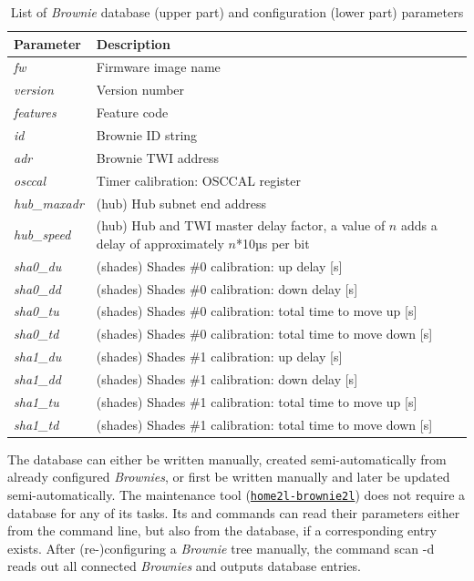 \documentclass[12pt,english,parskip=half,headheight=19pt]{scrreprt}
\newcommand{\lst}[1]{\colorbox{lstbackground}{\footnotesize\code{#1}}}
\newcommand{\lstf}[1]{\colorbox{lstbackground}{\ttfamily\footnotesize#1}}
\newcommand{\idx}[1]{#1\index{#1}}
\newcommand{\reftool}[1]{\hyperref[tool:#1]{\texttt{\idx{#1}}}}
\begin{document}
\begin{table}[ht]
  \centering
  \renewcommand{\arraystretch}{1.4}
  \begin{tabular}{l|p{12cm}}
    Parameter & Description \\
    \hline \hline
    \textit{fw}         & Firmware image name \\
    \textit{version}    & Version number \\
    \textit{features}   & Feature code \\
    \hline
    \textit{id}         & Brownie ID string \\
    \textit{adr}        & Brownie TWI address \\

    \textit{osccal}     & Timer calibration: OSCCAL register \\

    \textit{hub\_maxadr} & (hub) Hub subnet end address \\
    \textit{hub\_speed} & (hub) Hub and TWI master delay factor, a value of $n$ adds a delay of approximately $n$*10µs per bit \\

    \textit{sha0\_du}   & (shades) Shades \#0 calibration: up delay [s] \\
    \textit{sha0\_dd}   & (shades) Shades \#0 calibration: down delay [s] \\
    \textit{sha0\_tu}   & (shades) Shades \#0 calibration: total time to move up [s] \\
    \textit{sha0\_td}   & (shades) Shades \#0 calibration: total time to move down [s] \\
    \textit{sha1\_du}   & (shades) Shades \#1 calibration: up delay [s] \\
    \textit{sha1\_dd}   & (shades) Shades \#1 calibration: down delay [s] \\
    \textit{sha1\_tu}   & (shades) Shades \#1 calibration: total time to move up [s] \\
    \textit{sha1\_td}   & (shades) Shades \#1 calibration: total time to move down [s] \\
  \end{tabular}
  \caption[l]{List of \textit{Brownie} database (upper part) and configuration (lower part) parameters}
  \label{tab:brownies-config}
\end{table}

The database can either be written manually, created semi-automatically from already configured \textit{Brownies}, or first be written manually and later be updated semi-automatically. The maintenance tool (\reftool{home2l-brownie2l}) does not require a database for any of its tasks. Its \lst{config} and \lst{program} commands can read their parameters either from the command line, but also from the database, if a corresponding entry exists. After (re-)configuring a \textit{Brownie} tree manually, the command \lstf{scan -d} reads out all connected \textit{Brownies} and outputs database entries.
\end{document}
